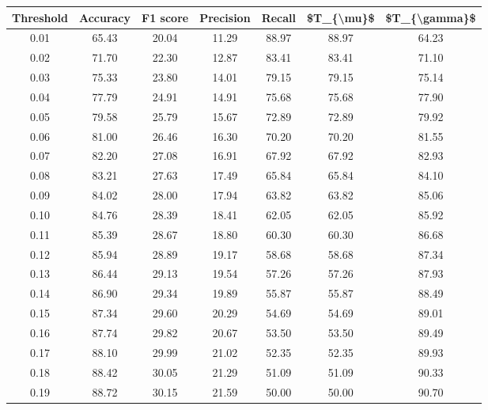 \begin{tabular}{|c|c|c|c|c|c|c|}
\hline
 Threshold &  Accuracy &  F1 score &  Precision &  Recall &  \$T\_\{\textbackslash mu\}\$ &  \$T\_\{\textbackslash gamma\}\$ \\
\hline
      0.01 &     65.43 &     20.04 &      11.29 &   88.97 &      88.97 &         64.23 \\
      0.02 &     71.70 &     22.30 &      12.87 &   83.41 &      83.41 &         71.10 \\
      0.03 &     75.33 &     23.80 &      14.01 &   79.15 &      79.15 &         75.14 \\
      0.04 &     77.79 &     24.91 &      14.91 &   75.68 &      75.68 &         77.90 \\
      0.05 &     79.58 &     25.79 &      15.67 &   72.89 &      72.89 &         79.92 \\
      0.06 &     81.00 &     26.46 &      16.30 &   70.20 &      70.20 &         81.55 \\
      0.07 &     82.20 &     27.08 &      16.91 &   67.92 &      67.92 &         82.93 \\
      0.08 &     83.21 &     27.63 &      17.49 &   65.84 &      65.84 &         84.10 \\
      0.09 &     84.02 &     28.00 &      17.94 &   63.82 &      63.82 &         85.06 \\
      0.10 &     84.76 &     28.39 &      18.41 &   62.05 &      62.05 &         85.92 \\
      0.11 &     85.39 &     28.67 &      18.80 &   60.30 &      60.30 &         86.68 \\
      0.12 &     85.94 &     28.89 &      19.17 &   58.68 &      58.68 &         87.34 \\
      0.13 &     86.44 &     29.13 &      19.54 &   57.26 &      57.26 &         87.93 \\
      0.14 &     86.90 &     29.34 &      19.89 &   55.87 &      55.87 &         88.49 \\
      0.15 &     87.34 &     29.60 &      20.29 &   54.69 &      54.69 &         89.01 \\
      0.16 &     87.74 &     29.82 &      20.67 &   53.50 &      53.50 &         89.49 \\
      0.17 &     88.10 &     29.99 &      21.02 &   52.35 &      52.35 &         89.93 \\
      0.18 &     88.42 &     30.05 &      21.29 &   51.09 &      51.09 &         90.33 \\
      0.19 &     88.72 &     30.15 &      21.59 &   50.00 &      50.00 &         90.70 \\

\end{tabular}
